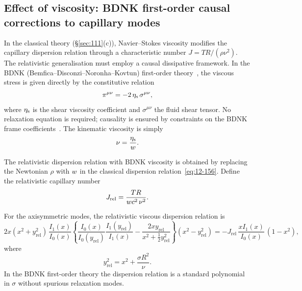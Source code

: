 \subsection{Effect of viscosity: BDNK first-order causal corrections to
capillary modes}
\label{sec:rel-111-viscosity}

In the classical theory (\S\ref{sec:111}(c)), Navier--Stokes
viscosity modifies the capillary dispersion relation through a
characteristic number $J = TR/(\rho\nu^{2})$.  The relativistic
generalisation must employ a causal dissipative framework.  In the
BDNK (Bemfica--Disconzi--Noronha--Kovtun) first-order
theory~\cite{BemficaDN2018,Kovtun2019,BemficaDN2019}, the viscous stress
is given directly by the constitutive relation
\begin{equation}
\label{eq:rel-111-IS}
\pi^{\mu\nu} = -2\,\eta_{\mathrm{s}}\,\sigma^{\mu\nu},
\end{equation}
where $\eta_{\mathrm{s}}$ is the shear viscosity coefficient and
$\sigma^{\mu\nu}$ the fluid shear tensor.  No relaxation equation is
required; causality is ensured by constraints on the BDNK frame
coefficients~\cite{BemficaDNK2023,HoultKovtun2020}.  The kinematic viscosity is
simply
\begin{equation}
\label{eq:rel-111-nueff}
\nu = \frac{\eta_{\mathrm{s}}}{w}.
\end{equation}

The relativistic dispersion relation with BDNK viscosity is obtained
by replacing the Newtonian $\rho$ with $w$ in the classical
dispersion relation~\eqref{eq:12-156}.  Define the relativistic
capillary number
\begin{equation}
\label{eq:rel-111-Jrel}
J_{\mathrm{rel}} = \frac{TR}{w c^{2}\,\nu^{2}}.
\end{equation}

For the axisymmetric modes, the relativistic viscous dispersion
relation is
\begin{equation}
\label{eq:rel-111-visc-disp}
2x(x^{2}+y_{\mathrm{rel}}^{2})\,
  \frac{I_{1}(x)}{I_{0}(x)}
  \left\{\frac{I_{0}(x)}{I_{0}(y_{\mathrm{rel}})}
    \frac{I_{1}(y_{\mathrm{rel}})}{I_{1}(x)}
    - \frac{2xy_{\mathrm{rel}}}
      {x^{2}+\tfrac{1}{2}y_{\mathrm{rel}}^{2}}\right\}
  (x^{2}-y_{\mathrm{rel}}^{2})
  = -J_{\mathrm{rel}}\,
  \frac{xI_{1}(x)}{I_{0}(x)}\,(1-x^{2}),
\end{equation}
where
\begin{equation}
\label{eq:rel-111-yrel}
y_{\mathrm{rel}}^{2} = x^{2}
  + \frac{\sigma R^{2}}{\nu}.
\end{equation}
In the BDNK first-order theory the dispersion relation is a standard
polynomial in $\sigma$ without spurious relaxation modes.

